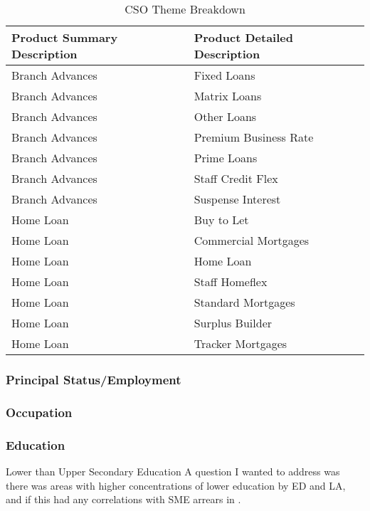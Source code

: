 \begin{table}[H]
	\centering
	\label{my-label}
	\begin{tabular}{|l|l|}
		\hline
		\textbf{Product Summary Description} & \textbf{Product Detailed Description} \\ \hline
		Branch Advances     & Fixed Loans \\ \hline
		Branch Advances     & Matrix Loans \\ \hline
		Branch Advances     & Other Loans \\ \hline
		Branch Advances     & Premium Business Rate \\ \hline
		Branch Advances     & Prime Loans \\ \hline
		Branch Advances     & Staff Credit Flex \\ \hline
		Branch Advances		& Suspense Interest \\ \hline
		Home Loan           & Buy to Let \\ \hline
		Home Loan           & Commercial Mortgages \\ \hline
		Home Loan           & Home Loan \\ \hline
		Home Loan           & Staff Homeflex \\ \hline
		Home Loan           & Standard Mortgages \\ \hline	
		Home Loan           & Surplus Builder \\ \hline		
		Home Loan           & Tracker Mortgages \\ \hline		
	\end{tabular}
	\caption{CSO Theme Breakdown}
\end{table}

\subsubsection{Principal Status/Employment}
\subsubsection{Occupation}
\subsubsection{Education}
Lower than Upper Secondary Education
A question I wanted to address was there was areas with higher concentrations of lower education by ED and LA, and if this had any correlations with SME arrears in \subjectname.

